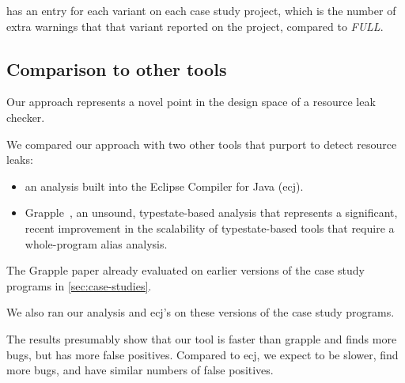  has an entry for each variant on each case study project,
which is the number of extra warnings that that variant reported on the project,
compared to \emph{FULL}.

\subsection{Comparison to other tools}
\label{sec:compare}

Our approach represents a novel point in the design space of a resource leak checker.

We compared our approach with two other tools that purport to detect resource leaks:
\begin{itemize}
\item an analysis built into the Eclipse Compiler for Java (ecj).
\item Grapple~\cite{}, an unsound, typestate-based analysis that represents a significant, recent
  improvement in the scalability of typestate-based tools that require a whole-program alias analysis.
\end{itemize}

The Grapple paper already evaluated on earlier versions of  the case study programs in \cref{sec:case-studies}.

We also ran our analysis and ecj's on these versions of the case study programs.

The results presumably show that our tool is faster than grapple and finds more bugs, but has more false positives.
Compared to ecj, we expect to be slower, find more bugs, and have similar numbers of false positives.

